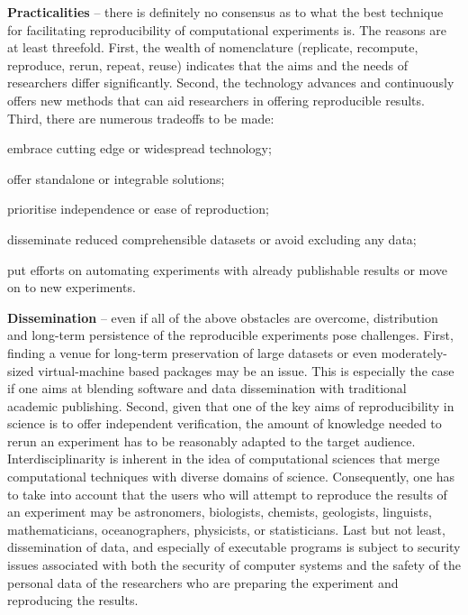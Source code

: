 {\bf Practicalities} -- there is definitely no consensus as to what the
  best technique for facilitating reproducibility of computational experiments is. 
The reasons are at least threefold. 
First, the wealth of nomenclature (replicate, recompute, reproduce, 
  rerun, repeat, reuse) indicates that the aims and the needs of researchers
  differ significantly.
Second, the technology advances and continuously offers new methods that can
  aid researchers in offering reproducible results.
Third, there are numerous tradeoffs to be made: 
  \begin{inparaenum}[(i)]
  \item embrace cutting edge or widespread technology; 
  \item offer standalone or integrable solutions; 
  \item prioritise independence or ease of reproduction; 
  \item disseminate reduced comprehensible datasets or avoid excluding any data;
  \item put efforts on automating experiments with already publishable results
  or move on to new experiments.
  \end{inparaenum}
    
{\bf Dissemination} -- even if all of the above obstacles are overcome, 
  distribution and long-term persistence of the reproducible experiments
  pose challenges.
First, finding a venue for long-term preservation of large datasets or even 
  moderately-sized virtual-machine based packages may be an issue.
This is especially the case if one aims at blending software and data
  dissemination with traditional academic publishing.
Second, given that one of the key aims of reproducibility in science
  is to offer independent verification, the amount of knowledge 
  needed to rerun an experiment has to be reasonably adapted to the
  target audience.
Interdisciplinarity is inherent in the idea of computational sciences that
  merge computational techniques with diverse domains of science.
Consequently, one has to take into account that the users who will attempt to
  reproduce the results of an experiment may be
  astronomers, biologists, chemists, geologists, linguists, mathematicians,
  oceanographers, physicists, or statisticians.
Last but not least, dissemination of data, and especially of executable
  programs is subject to security issues associated with both the security
  of computer systems and the safety of the personal data of the researchers who
  are preparing the experiment and reproducing the results.
